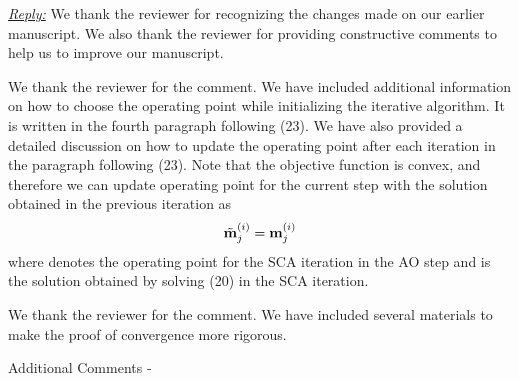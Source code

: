 
\vspace{1eM}
\underline{\textit{Reply:}} We thank the reviewer for recognizing the changes made on our earlier manuscript. We also thank the reviewer for providing constructive comments to help us to improve our manuscript.

\begin{enumerate}
 

\resp We thank the reviewer for the comment. We have included additional information on how to choose the operating point while initializing the iterative algorithm. It is written in the fourth paragraph following (23). We have also provided a detailed discussion on how to update the operating point after each iteration in the paragraph following (23). Note that the objective function is convex, and therefore we can update operating point for the current step with the solution obtained in the previous iteration as
\begin{equation}
\tilde{\mathbf{m}}_{j}^{(i)} = \mathbf{m}_{j}^{(i)}
\end{equation}
where  denotes the operating point for the  \ac{SCA} iteration in the  \ac{AO} step and  is the solution obtained by solving (20) in the  \ac{SCA} iteration.

 

\resp We thank the reviewer for the comment. We have included several materials to make the proof of convergence more rigorous.

Additional Comments - 

\begin{enumerate}
	

\end{enumerate}
\end{enumerate}
